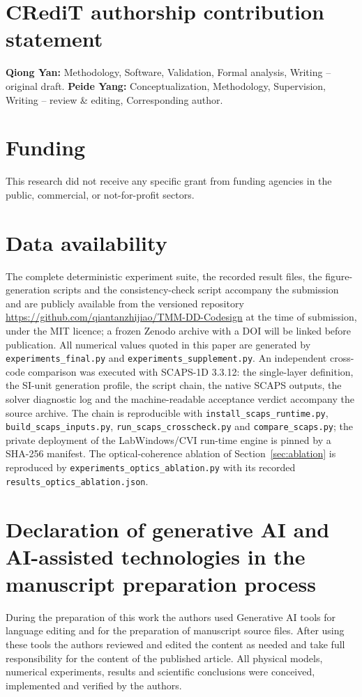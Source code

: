 \documentclass[preprint,12pt]{elsarticle}
\begin{document}
\section*{CRediT authorship contribution statement}
\textbf{Qiong Yan:} Methodology, Software, Validation, Formal analysis,
Writing -- original draft. \textbf{Peide Yang:} Conceptualization,
Methodology, Supervision, Writing -- review \& editing, Corresponding author.

\section*{Funding}
This research did not receive any specific grant from funding agencies in the
public, commercial, or not-for-profit sectors.

\section*{Data availability}
The complete deterministic experiment suite, the recorded result files, the
figure-generation scripts and the consistency-check script accompany the
submission and are publicly available from the versioned repository
\url{https://github.com/qiantanzhijiao/TMM-DD-Codesign} at the time of submission, under the MIT licence; a frozen
Zenodo archive with a DOI will be linked before publication. All numerical values quoted in this paper are generated by
\mbox{\texttt{experiments\_final.py}} and
\mbox{\texttt{experiments\_supplement.py}}. An independent
cross-code comparison was executed with SCAPS-1D 3.3.12: the
single-layer definition, the SI-unit generation profile, the script
chain, the native SCAPS outputs, the solver diagnostic log and the
machine-readable acceptance verdict accompany the source archive.
The chain is reproducible with \texttt{install\_scaps\_runtime.py},
\texttt{build\_scaps\_inputs.py},
\texttt{run\_scaps\_crosscheck.py} and
\texttt{compare\_scaps.py}; the private deployment of the
LabWindows/CVI run-time engine is pinned by a SHA-256 manifest. The optical-coherence ablation of Section~\ref{sec:ablation} is
reproduced by \texttt{experiments\_optics\_ablation.py} with its
recorded \texttt{results\_optics\_ablation.json}.

\section*{Declaration of generative AI and AI-assisted technologies in the
manuscript preparation process}
During the preparation of this work the authors used Generative AI tools
for language editing and for the preparation of manuscript source files.
After using these tools the authors reviewed and edited the content as
needed and take full responsibility for the content of the published
article. All physical models, numerical experiments, results and
scientific conclusions were conceived, implemented and verified by the
authors.
\end{document}
